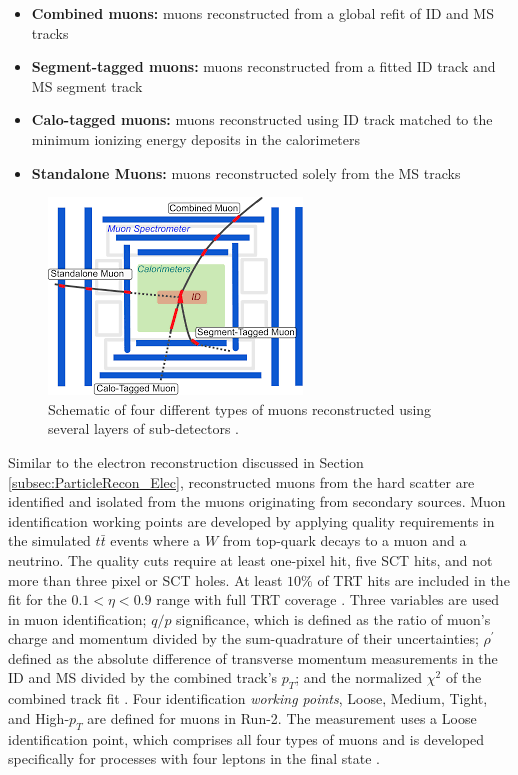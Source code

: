 \begin{itemize}
    \item{\textbf{Combined muons:} muons reconstructed from a global refit of ID and MS tracks }
    \item{\textbf{Segment-tagged muons:} muons reconstructed from a fitted ID track and MS segment track } 
    \item{\textbf{Calo-tagged muons:}  muons reconstructed using ID track matched to the minimum ionizing energy deposits in the calorimeters}
    \item{\textbf{Standalone Muons:} muons reconstructed solely from the MS tracks }
\end{itemize}

\begin{figure}
    \centering
    \includegraphics[width=.5\linewidth]{figures/LHC/MuonTypes.pdf}
    \caption{ Schematic of four different types of muons reconstructed using several layers of sub-detectors \cite{MuonReco}.\label{fig:MuonFig}}
\end{figure}

Similar to the electron reconstruction discussed in Section \ref{subsec:ParticleRecon_Elec}, reconstructed muons from the hard scatter are identified and isolated from the muons originating from secondary sources. Muon identification working points are developed by applying quality requirements in the simulated $t\bar{t}$ events where a $W$ from top-quark decays to a muon and a neutrino. The quality cuts require at least one-pixel hit, five SCT hits, and not more than three pixel or SCT holes. At least $10\%$ of TRT hits are included in the fit for the $0.1<\eta<0.9$ range with full TRT coverage \cite{MuonReco}. Three variables are used in muon identification; $q/p$ significance, which is defined as the ratio of muon's charge and momentum divided by the sum-quadrature of their uncertainties; $\rho^{'}$ defined as the absolute difference of transverse momentum measurements in the ID and MS divided by the combined track's $p_{T}$; and the normalized $\chi ^{2}$ of the combined track fit \cite{MuonReco}. 
Four identification \textit{working points}, Loose, Medium, Tight, and High-$p_{T}$ are defined for muons in Run-2. The measurement uses a Loose identification point, which comprises all four types of muons and is developed specifically for processes with four leptons in the final state  \cite{MuonReco}. 

